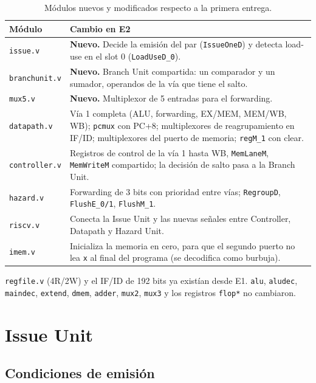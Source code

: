 \documentclass[12pt,a4paper]{article}
\begin{document}
\begin{table}[H]
\centering
\small
\begin{tabularx}{\linewidth}{lX}
\toprule
\textbf{Módulo} & \textbf{Cambio en E2} \\
\midrule
\texttt{issue.v} & \textbf{Nuevo.} Decide la emisión del par (\texttt{IssueOneD}) y detecta load-use en el slot 0 (\texttt{LoadUseD\_0}). \\
\texttt{branchunit.v} & \textbf{Nuevo.} Branch Unit compartida: un comparador y un sumador, operandos de la vía que tiene el salto. \\
\texttt{mux5.v} & \textbf{Nuevo.} Multiplexor de 5 entradas para el forwarding. \\
\texttt{datapath.v} & Vía 1 completa (ALU, forwarding, EX/MEM, MEM/WB, WB); \texttt{pcmux} con PC+8; multiplexores de reagrupamiento en IF/ID; multiplexores del puerto de memoria; \texttt{regM\_1} con clear. \\
\texttt{controller.v} & Registros de control de la vía 1 hasta WB, \texttt{MemLaneM}, \texttt{MemWriteM} compartido; la decisión de salto pasa a la Branch Unit. \\
\texttt{hazard.v} & Forwarding de 3 bits con prioridad entre vías; \texttt{RegroupD}, \texttt{FlushE\_0/1}, \texttt{FlushM\_1}. \\
\texttt{riscv.v} & Conecta la Issue Unit y las nuevas señales entre Controller, Datapath y Hazard Unit. \\
\texttt{imem.v} & Inicializa la memoria en cero, para que el segundo puerto no lea \texttt{x} al final del programa (se decodifica como burbuja). \\
\bottomrule
\end{tabularx}
\caption{Módulos nuevos y modificados respecto a la primera entrega.}
\label{tab:modulos}
\end{table}

\noindent \texttt{regfile.v} (4R/2W) y el IF/ID de 192 bits ya existían desde E1. \texttt{alu}, \texttt{aludec}, \texttt{maindec}, \texttt{extend}, \texttt{dmem}, \texttt{adder}, \texttt{mux2}, \texttt{mux3} y los registros \texttt{flop*} no cambiaron.

\section{Issue Unit}
\label{sec:issue}

\subsection{Condiciones de emisión}
\end{document}
